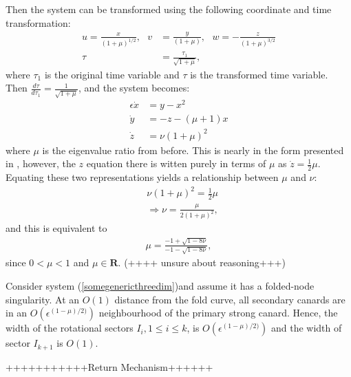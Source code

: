 Then the system can be transformed using the following coordinate and time transformation:
\begin{align*}
u= \frac{x}{(1+ \mu)^{1/2}}, \ \ \ v &= \frac{y}{(1 + \mu)}, \ \ \  w= -\frac{z}{ (1+\mu)^{3/2}}  \\
\tau &= \frac{\tau_1}{\sqrt{1 + \mu}},
\end{align*}
where $\tau_1$ is the original time variable and $\tau$ is the transformed time variable.
Then $\frac{d \tau}{d \tau_1} = \frac{1}{\sqrt{1+ \mu}}$, and the system becomes:
\begin{align*}
\epsilon \dot{x} &= y - x^2\\
\dot{y} &=- z -(\mu +1)x \\
\dot{z} &= \nu (1 + \mu)^2
\end{align*}
where $\mu$ is the eigenvalue ratio from before.
This is nearly in the form presented in \citet{MMO}, however, the $z$ equation there is witten purely in terms of $\mu$ as $\dot{z} = \frac{1}{2} \mu$.
Equating these two representations yields a relationship between $\mu$ and $\nu$:
\begin{align*}
&\nu (1 + \mu)^2 = \frac{1}{2} \mu \\
&\Rightarrow \nu = \frac{\mu}{ 2 (1+ \mu)^2},
\end{align*}
and this is equivalent to 
\begin{align*}
\mu = \frac{ -1 + \sqrt{1 - 8\nu}}{-1 - \sqrt{ 1- 8 \nu}},
\end{align*}
since $0< \mu < 1$ and $\mu \in \mathbf{R}$. (++++ unsure about reasoning+++)





\begin{theorem}
Consider system (\ref{somegenericthreedim})and assume it has a folded-node singularity. At an $O(1)$ distance from the fold curve, all secondary canards are in an $O(\epsilon^{(1- \mu)/2)})$ neighbourhood of the primary strong canard. Hence, the width of the  rotational sectors $I_i, 1 \leq i \leq k$, is $O(\epsilon^{(1- \mu)/2)})$ and the width of sector $I_{k+1}$ is $O(1)$.
\end{theorem}



+++++++++++Return Mechanism++++++


